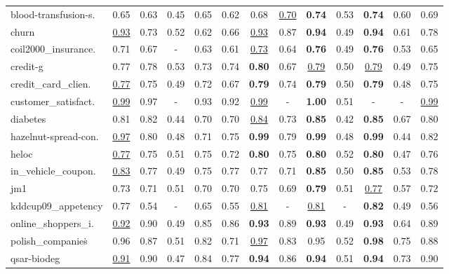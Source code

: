 \begin{table}[t]
\begin{tabular*}{\textwidth}{@{\extracolsep{\fill}} l c c c c c c c c c c c c @{{}}}
blood-transfusion-s. & 0.65 & 0.63 & 0.45 & 0.65 & 0.62 & 0.68 & \underline{0.70} & \textbf{0.74} & 0.53 & \textbf{0.74} & 0.60 & 0.69 \\
churn & \underline{0.93} & 0.73 & 0.52 & 0.62 & 0.66 & \underline{0.93} & 0.87 & \textbf{0.94} & 0.49 & \textbf{0.94} & 0.61 & 0.78 \\
coil2000\_insurance. & 0.71 & 0.67 & - & 0.63 & 0.61 & \underline{0.73} & 0.64 & \textbf{0.76} & 0.49 & \textbf{0.76} & 0.53 & 0.65 \\
credit-g & 0.77 & 0.78 & 0.53 & 0.73 & 0.74 & \textbf{0.80} & 0.67 & \underline{0.79} & 0.50 & \underline{0.79} & 0.49 & 0.75 \\
credit\_card\_clien. & \underline{0.77} & 0.75 & 0.49 & 0.72 & 0.67 & \textbf{0.79} & 0.74 & \textbf{0.79} & 0.50 & \textbf{0.79} & 0.48 & 0.75 \\
customer\_satisfact. & \underline{0.99} & 0.97 & - & 0.93 & 0.92 & \underline{0.99} & - & \textbf{1.00} & 0.51 & - & - & \underline{0.99} \\
diabetes & 0.81 & 0.82 & 0.44 & 0.70 & 0.70 & \underline{0.84} & 0.73 & \textbf{0.85} & 0.42 & \textbf{0.85} & 0.67 & 0.80 \\
hazelnut-spread-con. & \underline{0.97} & 0.80 & 0.48 & 0.71 & 0.75 & \textbf{0.99} & 0.79 & \textbf{0.99} & 0.48 & \textbf{0.99} & 0.44 & 0.82 \\
heloc & \underline{0.77} & 0.75 & 0.51 & 0.75 & 0.72 & \textbf{0.80} & 0.75 & \textbf{0.80} & 0.52 & \textbf{0.80} & 0.47 & 0.76 \\
in\_vehicle\_coupon. & \underline{0.83} & 0.77 & 0.49 & 0.75 & 0.77 & 0.77 & 0.71 & \textbf{0.85} & 0.50 & \textbf{0.85} & 0.53 & 0.78 \\
jm1 & 0.73 & 0.71 & 0.51 & 0.70 & 0.70 & 0.75 & 0.69 & \textbf{0.79} & 0.51 & \underline{0.77} & 0.57 & 0.72 \\
kddcup09\_appetency & 0.77 & 0.54 & - & 0.65 & 0.55 & \underline{0.81} & - & \underline{0.81} & - & \textbf{0.82} & 0.49 & 0.56 \\
online\_shoppers\_i. & \underline{0.92} & 0.90 & 0.49 & 0.85 & 0.86 & \textbf{0.93} & 0.89 & \textbf{0.93} & 0.49 & \textbf{0.93} & 0.64 & 0.89 \\
polish\_companies\. & 0.96 & 0.87 & 0.51 & 0.82 & 0.71 & \underline{0.97} & 0.83 & 0.95 & 0.52 & \textbf{0.98} & 0.75 & 0.88 \\
qsar-biodeg & \underline{0.91} & 0.90 & 0.47 & 0.84 & 0.77 & \textbf{0.94} & 0.86 & \textbf{0.94} & 0.51 & \textbf{0.94} & 0.73 & 0.90 \\

\end{tabular*}
\end{table}
